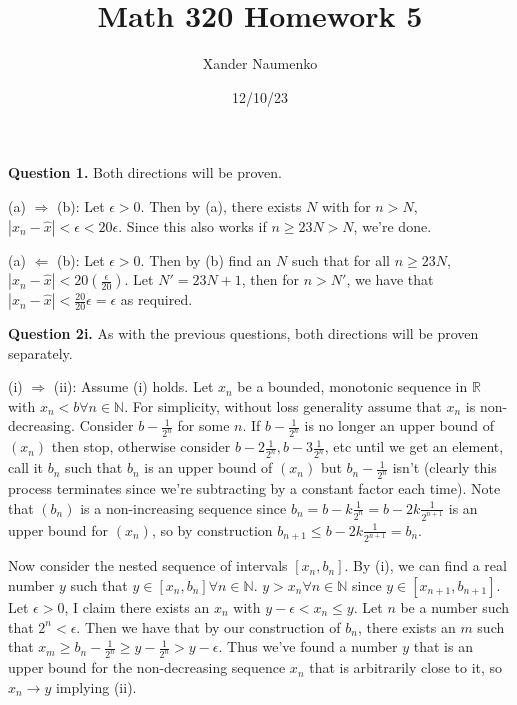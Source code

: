 \documentclass[letterpaper, reqno,11pt]{article}
\begin{document}
\title{Math 320 Homework 5}
\date{12/10/23}
\author{Xander Naumenko}
\maketitle

{\medskip\noindent\bf Question 1.} Both directions will be proven. 

(a) $\Rightarrow$ (b): Let $\epsilon>0$. Then by (a), there exists $N$ with for $n>N$, $\left| x_n-\hat x \right| <\epsilon<20\epsilon$. Since this also works if $n\geq 23N>N$, we're done.

(a) $\Leftarrow$ (b): Let $\epsilon>0$. Then by (b) find an $N$ such that for all $n\geq 23N$, $\left| x_n-\hat x \right|< 20(\frac{\epsilon}{20})$. Let $N'=23N+1$, then for $n>N'$, we have that $\left| x_n-\hat x \right| <\frac{20}{20}\epsilon=\epsilon$ as required.

\newpage\phantom{blabla}
\newpage

{\medskip\noindent\bf Question 2i.} As with the previous questions, both directions will be proven separately.

(i) $\Rightarrow$ (ii): Assume (i) holds. Let $x_n$ be a bounded, monotonic sequence in $\mathbb{R}$ with $x_n<b\forall n\in \mathbb{N}$. For simplicity, without loss generality assume that $x_n$ is non-decreasing. Consider $b-\frac{1}{2^{n}}$ for some $n$. If $b-\frac{1}{2^{n}}$ is no longer an upper bound of $(x_n)$ then stop, otherwise consider $b-2\frac{1}{2^{n}},b-3 \frac{1}{2^{n}}$, etc until we get an element, call it $b_n$ such that $b_n$ is an upper bound of $(x_n)$ but $b_n-\frac{1}{2^{n}}$ isn't (clearly this process terminates since we're subtracting by a constant factor each time). Note that $(b_n)$ is a non-increasing sequence since $b_n=b-k \frac{1}{2^{n}}=b-2k \frac{1}{2^{n+1}}$ is an upper bound for $(x_n)$, so by construction $b_{n+1}\leq b-2k \frac{1}{2^{n+1}}=b_{n}$.

Now consider the nested sequence of intervals $[x_n,b_n]$. By (i), we can find a real number $y$ such that $y\in [x_n,b_n]\forall n\in \mathbb{N}$. $y>x_n\forall n\in \mathbb{N}$ since $y\in [x_{n+1},b_{n+1}]$. Let $\epsilon>0$, I claim there exists an $x_n$ with $y-\epsilon<x_n\leq y$. Let $n$ be a number such that $2^{n}<\epsilon$. Then we have that by our construction of $b_n$, there exists an $m$ such that $x_m\geq b_n-\frac{1}{2^{n}}\geq y-\frac{1}{2^{n}}> y-\epsilon$. Thus we've found a number $y$ that is an upper bound for the non-decreasing sequence $x_n$ that is arbitrarily close to it, so $x_n\to y$ implying (ii).
\end{document}
